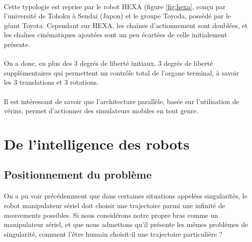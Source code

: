 \documentclass[a4paper,10pt]{article}
\begin{document}
            \paragraph{}
                Cette typologie est reprise par le robot HEXA (figure \ref{fig:hexa}, conçu par l'université 
                de Tohoku à Sendai (Japon) et le groupe Toyoda, possédé par le géant Toyota. 
                Cependant sur HEXA, les chaînes d'actionnement sont doublées, et les chaînes 
                cinématiques ajoutées sont un peu écartées de celle initialement présente. 
                
            \paragraph{}
                On a donc, en plus des 3 degrés de liberté initiaux, 3 degrés de liberté
                supplémentaires qui permettent un contrôle total de l'organe terminal, 
                à savoir les 3 translations et 3 rotations. 
                
            \paragraph{}
                Il est intéressant de savoir que l'architecture parallèle, basée sur 
                l'utilisation de vérins, permet d'actionner des simulateurs mobiles 
                en tout genre. 
    
    \section{De l'intelligence des robots}
        \subsection{Positionnement du problème}
            \paragraph{}
                On a pu voir précédemment que dans certaines situations appelées 
                singularités, le robot manipulateur sériel doit choisir une trajectoire parmi une 
                infinité de mouvements possibles. 
                Si nous considérons notre propre bras comme un manipulateur sériel, et que 
                nous admettons qu'il présente les mêmes problèmes de singularité, comment l'être 
                humain choisit-il une trajectoire particulière ? 
                
\end{document}
